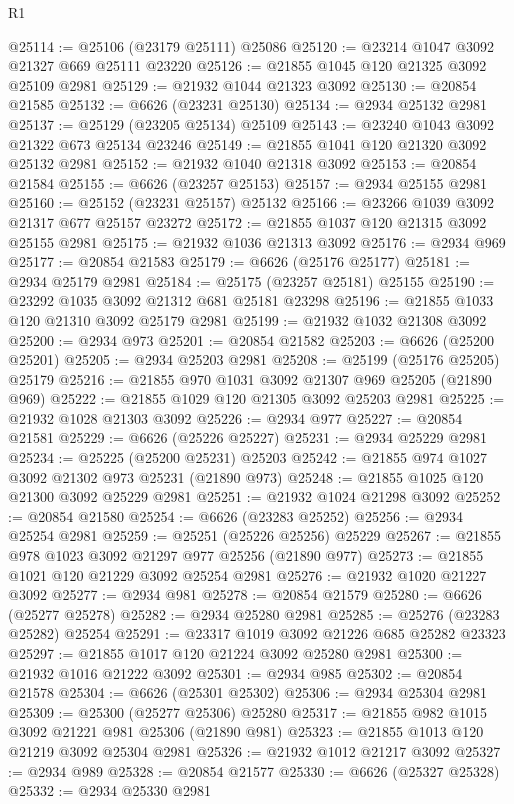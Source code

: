 \begin{lexlean}{R1}
\begin{coremodule}
@25114 := @25106 (@23179 @25111) @25086
@25120 := @23214 @1047 @3092 @21327 @669 @25111 @23220
@25126 := @21855 @1045 @120 @21325 @3092 @25109 @2981
@25129 := @21932 @1044 @21323 @3092
@25130 := @20854 @21585
@25132 := @6626 (@23231 @25130)
@25134 := @2934 @25132 @2981
@25137 := @25129 (@23205 @25134) @25109
@25143 := @23240 @1043 @3092 @21322 @673 @25134 @23246
@25149 := @21855 @1041 @120 @21320 @3092 @25132 @2981
@25152 := @21932 @1040 @21318 @3092
@25153 := @20854 @21584
@25155 := @6626 (@23257 @25153)
@25157 := @2934 @25155 @2981
@25160 := @25152 (@23231 @25157) @25132
@25166 := @23266 @1039 @3092 @21317 @677 @25157 @23272
@25172 := @21855 @1037 @120 @21315 @3092 @25155 @2981
@25175 := @21932 @1036 @21313 @3092
@25176 := @2934 @969
@25177 := @20854 @21583
@25179 := @6626 (@25176 @25177)
@25181 := @2934 @25179 @2981
@25184 := @25175 (@23257 @25181) @25155
@25190 := @23292 @1035 @3092 @21312 @681 @25181 @23298
@25196 := @21855 @1033 @120 @21310 @3092 @25179 @2981
@25199 := @21932 @1032 @21308 @3092
@25200 := @2934 @973
@25201 := @20854 @21582
@25203 := @6626 (@25200 @25201)
@25205 := @2934 @25203 @2981
@25208 := @25199 (@25176 @25205) @25179
@25216 := @21855 @970 @1031 @3092 @21307 @969 @25205 (@21890 @969)
@25222 := @21855 @1029 @120 @21305 @3092 @25203 @2981
@25225 := @21932 @1028 @21303 @3092
@25226 := @2934 @977
@25227 := @20854 @21581
@25229 := @6626 (@25226 @25227)
@25231 := @2934 @25229 @2981
@25234 := @25225 (@25200 @25231) @25203
@25242 := @21855 @974 @1027 @3092 @21302 @973 @25231 (@21890 @973)
@25248 := @21855 @1025 @120 @21300 @3092 @25229 @2981
@25251 := @21932 @1024 @21298 @3092
@25252 := @20854 @21580
@25254 := @6626 (@23283 @25252)
@25256 := @2934 @25254 @2981
@25259 := @25251 (@25226 @25256) @25229
@25267 := @21855 @978 @1023 @3092 @21297 @977 @25256 (@21890 @977)
@25273 := @21855 @1021 @120 @21229 @3092 @25254 @2981
@25276 := @21932 @1020 @21227 @3092
@25277 := @2934 @981
@25278 := @20854 @21579
@25280 := @6626 (@25277 @25278)
@25282 := @2934 @25280 @2981
@25285 := @25276 (@23283 @25282) @25254
@25291 := @23317 @1019 @3092 @21226 @685 @25282 @23323
@25297 := @21855 @1017 @120 @21224 @3092 @25280 @2981
@25300 := @21932 @1016 @21222 @3092
@25301 := @2934 @985
@25302 := @20854 @21578
@25304 := @6626 (@25301 @25302)
@25306 := @2934 @25304 @2981
@25309 := @25300 (@25277 @25306) @25280
@25317 := @21855 @982 @1015 @3092 @21221 @981 @25306 (@21890 @981)
@25323 := @21855 @1013 @120 @21219 @3092 @25304 @2981
@25326 := @21932 @1012 @21217 @3092
@25327 := @2934 @989
@25328 := @20854 @21577
@25330 := @6626 (@25327 @25328)
@25332 := @2934 @25330 @2981

\end{coremodule}
\end{lexlean}
